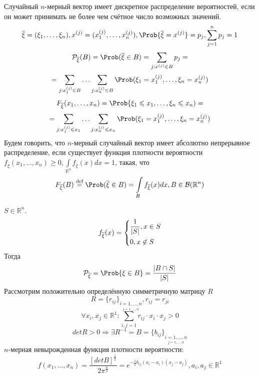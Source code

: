 Случайный $n$-мерный вектор имеет дискретное распределение вероятностей, если он может принимать не более чем счётное число возможных значений.
\[
	\overline{\xi} = (\xi_1, \ldots, \xi_n), x^{(j)} = (x_1^{(j)}, \ldots, x_n^{(j)}), \Prob \{ \overline{\xi} = x^{(j)} \} = p_j, \sum\limits_{j=1}^n p_j = 1
\]
\[
		\mathcal{P}_{\overline{\xi}} (B) = \Prob (\overline{\xi} \in B) = \sum\limits_{j: x^{(j)} \in B} p_j =
\]
\[
	= \sum\limits_{j: x_1^{(j)} \in B} \ldots \sum\limits_{j: x_n^{(j)} \in B} \Prob (\xi_1 = x_1^{(j)}, \ldots, \xi_n = x_n^{(j)})
\]
\[ 
F_{\overline{\xi}} (x_1, \ldots, x_n) = \Prob \{ \xi_1  \leqslant x_1, \ldots, \xi_n \leqslant x_n) = \]
\[ = \sum\limits_{j: x_1^{(j)} \leqslant x_1} \ldots \sum\limits_{j: x_n^{(j)} \leqslant x_n} \Prob (\xi_1 = x_1^{(j)}, \ldots, \xi_n = x_n^{(j)})
\]
Будем говорить, что $n$-мерный случайный вектор имеет абсолютно непрерывное распределение, если существует функция плотности вероятности $f_{\overline{\xi}} (x_1, \ldots, x_n) \geqslant 0, \int\limits_{\mathbb{R}^n} f_{\overline{\xi}} (x) dx = 1$, такая, что
\[
	F_{\overline{\xi}} (B) \overset{\textrm{def}}{=} \Prob (\overline{\xi} \in B) = \int\limits_B f_{\overline{\xi}} (x) dx, B \in \mathcal{B} (\mathbb{R}^n)
\]
\begin{example}
	$S \in \mathbb{R}^n$. \\
	\[
		f_{\overline{\xi}} (x) = \begin{dcases*}
 		\frac{1}{|S|}, x \in S \\
 		0, x \not \in S
 		\end{dcases*}
	\]
	Тогда
	\[
		\mathcal{P}_{\overline{\xi}} = \Prob \{ \xi \in B \} = \frac{|B \cap S|}{|S|}
	\]
	Рассмотрим положительно определённую симметричную матрицу $R$
	\[
		R = {\{ r_{ij} \}}_{\underset{j = 1, \ldots, n}{i = 1, \ldots, n}}, r_{ij} = r_{ji}
		\]
	\[
		\forall x_i, x_j \in \mathbb{R}^1: \sum\limits_{i, j = 1} r_{ij} \cdot x_i \cdot x_j > 0
	\]
	\[
		det R > 0 \Rightarrow \exists R^{-1} = B = {\{ b_{ij} \}}_{\underset{j = 1, \ldots, n}{i = 1, \ldots, n}}
	\]
	$n$-мерная невырожденная функция плотности вероятности:
	\[
		f (x_1, \ldots, x_n) = \frac{{[det B]}^{\frac{1}{2}}}{2 \pi^{\frac{n}{2}}} = e^{-\frac{1}{2} b_{ij}(x_i - a_i)(x_j - a_j)}, a_i, a_j \in \mathbb{R}^1
	\]
\end{example}

\setcounter{equation}{0}

